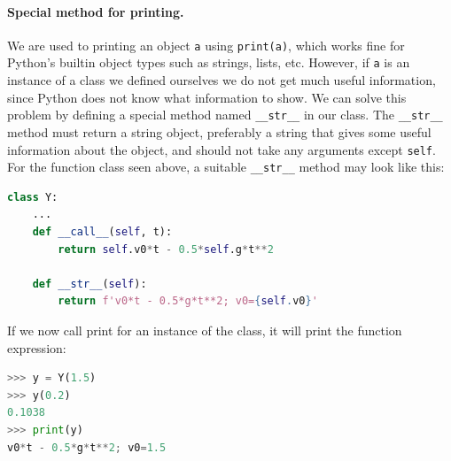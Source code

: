 \documentclass[graybox,envcountchap,sectrefs,final]{svmonodo}
\begin{document}
\paragraph{Special method for printing.}
We are used to printing an object \texttt{a} using \texttt{print(a)}, which works fine for Python's builtin object types such as
strings, lists, etc. However, if \texttt{a} is an instance of a class we defined ourselves we do not get much useful information,
since Python does not know what information to show. We can solve this problem by defining a special method
named \Verb!__str__! in our class. The \Verb!__str__! method must return a string object, preferably a string that gives some
useful information about the object, and should not take any arguments except \texttt{self}.
For the function class seen above, a suitable \Verb!__str__! method may look
like this:
\begin{lstlisting}[language=Python,style=blue1]
class Y:
    ...
    def __call__(self, t):
        return self.v0*t - 0.5*self.g*t**2

    def __str__(self):
        return f'v0*t - 0.5*g*t**2; v0={self.v0}'
\end{lstlisting}
If we now call print for an instance of the class, it will print the function expression:
\begin{lstlisting}[language=Python,style=blue1]
>>> y = Y(1.5)
>>> y(0.2)
0.1038
>>> print(y)
v0*t - 0.5*g*t**2; v0=1.5
\end{lstlisting}
\end{document}
